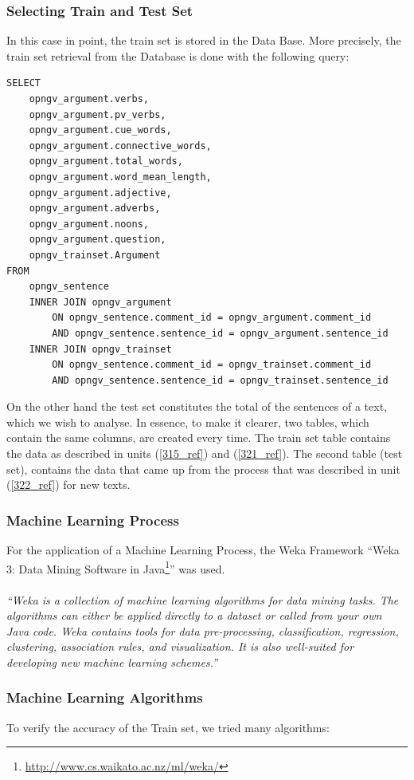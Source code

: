 \subsubsection{Selecting Train and Test Set}\label{3231_ref}
In this case in point, the train set is stored in the Data Base. More precisely, the train set retrieval from the Database is done with the following query:
\lstset{language=SQL}
\begin{lstlisting}[frame=single, basicstyle=\small]
SELECT
	opngv_argument.verbs,
	opngv_argument.pv_verbs,
	opngv_argument.cue_words,
	opngv_argument.connective_words,
	opngv_argument.total_words,
	opngv_argument.word_mean_length,
	opngv_argument.adjective,
	opngv_argument.adverbs,
	opngv_argument.noons,
	opngv_argument.question,
	opngv_trainset.Argument
FROM
	opngv_sentence
	INNER JOIN opngv_argument
		ON opngv_sentence.comment_id = opngv_argument.comment_id
	 	AND opngv_sentence.sentence_id = opngv_argument.sentence_id
	INNER JOIN opngv_trainset
	 	ON opngv_sentence.comment_id = opngv_trainset.comment_id
	 	AND opngv_sentence.sentence_id = opngv_trainset.sentence_id
\end{lstlisting}
On the other hand the test set constitutes the total of the sentences of a text, which we wish to analyse. In essence, to make it clearer, two tables, which contain the same columns, are created every time. The train set table contains the data as described in units (\ref{315_ref}) and (\ref{321_ref}). The second table (test set), contains the data that came up from the process that was described in unit (\ref{322_ref}) for new texts.

\subsubsection{Machine Learning Process}\label{3232_ref}
For the application of a Machine Learning Process, the Weka Framework ``Weka 3: Data Mining Software in Java\footnote{\url{http://www.cs.waikato.ac.nz/ml/weka/}}'' was used.\\
\\
\textit{“Weka is a collection of machine learning algorithms for data mining tasks. The algorithms can either be applied directly to a dataset or called from your own Java code. Weka contains tools for data pre-processing, classification, regression, clustering, association rules, and visualization. It is also well-suited for developing new machine learning schemes.”}

\subsubsection{Machine Learning Algorithms}\label{3233_ref}
To verify the accuracy of the Train set, we tried many algorithms:\\

